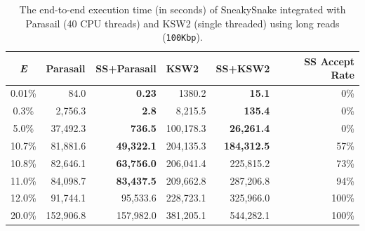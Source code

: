 {\begin{table}[H]
\caption{The end-to-end execution time (in seconds) of SneakySnake integrated with Parasail (40 CPU threads) and KSW2 (single threaded) using long reads (\texttt{100Kbp}).}
\label{table:1}
\centering
\begin{tabularx}{\linewidth}{c|rrrrr}
\hline
\textit{\textbf{E}} & \multicolumn{1}{l}{\textbf{Parasail}} & \multicolumn{1}{l}{\textbf{SS+Parasail}} & \multicolumn{1}{l}{\textbf{KSW2}} & \multicolumn{1}{l}{\textbf{SS+KSW2}} &  
\begin{minipage}[c] [.7cm] [c] {0.15\columnwidth}%
\centering
\textbf{SS Accept Rate} %
\end{minipage}
\\ \hline
0.01\% & 84.0 & \textbf{0.23} & 1380.2 & \textbf{15.1} & 0\% \\
0.3\% & 2,756.3 & \textbf{2.8} & 8,215.5 & \textbf{135.4} & 0\% \\
5.0\% & 37,492.3 & \textbf{736.5} & 100,178.3 & \textbf{26,261.4} & 0\% \\
10.7\% & 81,881.6 & \textbf{49,322.1} & 204,135.3 & \textbf{184,312.5} & 57\% \\
10.8\% & 82,646.1 & \textbf{63,756.0} & 206,041.4 & 225,815.2 & 73\% \\
11.0\% & 84,098.7 & \textbf{83,437.5} & 209,662.8 & 287,206.8 & 94\% \\
12.0\% & 91,744.1 & 95,533.6 & 228,723.1 & 325,966.0 & 100\% \\
20.0\% & 152,906.8 & 157,982.0 & 381,205.1 & 544,282.1 & 100\% \\ \hline
\end{tabularx}
\end{table}


}
